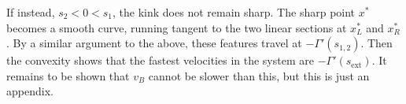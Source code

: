 \documentclass[aps,prx,reprint,superscriptaddress, longbibliography]{revtex4-1}
\newcommand{\charlie}[1]{{\color{Magenta}{{#1}}}}
\begin{document}
If instead, $s_2<0<s_1$, the kink does not remain sharp. The sharp point $x^*$ becomes a smooth curve, running tangent to the two linear sections at $x^*_L$ and $x^*_R$. By a similar argument to the above, these features travel at $-\Gamma'(s_{1,2})$. Then the convexity shows that the fastest velocities in the system are $-\Gamma'(s_\text{ext})$. It remains to be shown that $v_B$ cannot be slower than this, but this is just an appendix.

%
%

%	
%
\end{document}
